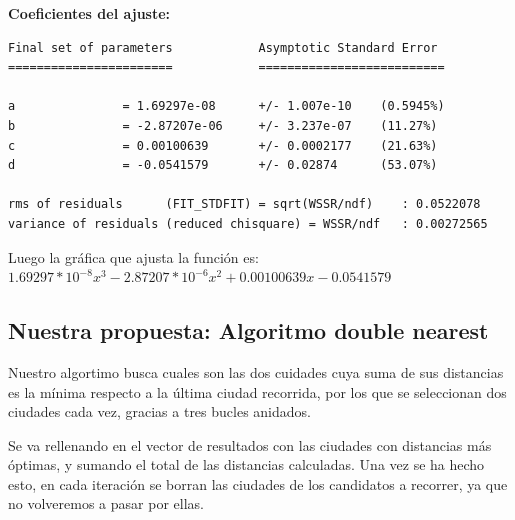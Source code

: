 \documentclass[a4]{article}
\begin{document}
\vspace{5mm}
\textbf{Coeficientes del ajuste:}
\begin{verbatim}
Final set of parameters            Asymptotic Standard Error
=======================            ==========================

a               = 1.69297e-08      +/- 1.007e-10    (0.5945%)
b               = -2.87207e-06     +/- 3.237e-07    (11.27%)
c               = 0.00100639       +/- 0.0002177    (21.63%)
d               = -0.0541579       +/- 0.02874      (53.07%)

rms of residuals      (FIT_STDFIT) = sqrt(WSSR/ndf)    : 0.0522078
variance of residuals (reduced chisquare) = WSSR/ndf   : 0.00272565
\end{verbatim}

Luego la gráfica que ajusta la función es: $1.69297*10^{-8}x^3 - 2.87207*10^{-6}x^2 + 0.00100639x - 0.0541579$ 

\begin{figure}[H]
  \centering
{}
\end{figure}

\subsection{Nuestra propuesta: Algoritmo double nearest}

Nuestro algortimo busca cuales son las dos cuidades cuya suma de sus
distancias es la mínima respecto a la última ciudad recorrida, por los que se seleccionan dos ciudades cada vez, gracias a tres bucles
anidados.

Se va rellenando en el vector de resultados con las ciudades con
distancias más óptimas, y sumando el total de las distancias
calculadas. Una vez se ha hecho esto, en cada iteración se borran las
ciudades de los candidatos a recorrer, ya que no volveremos a pasar
por ellas.
\end{document}
